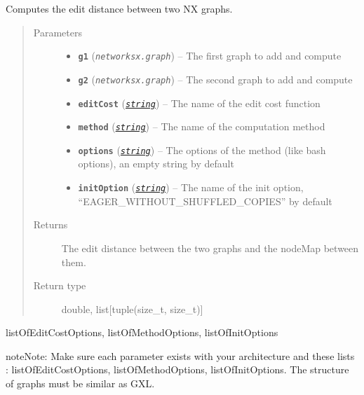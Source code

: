 \documentclass[letterpaper,10pt,english]{sphinxmanual}
\begin{document}
\begin{fulllineitems}
\label{doc:PythonGedLib.computeGedOnTwoGraphs}
Computes the edit distance between two NX graphs.
\begin{quote}\begin{description}
\item[{Parameters}] \leavevmode\begin{itemize}
\item {} 
\textbf{\texttt{g1}} (\emph{\texttt{networksx.graph}}) -- The first graph to add and compute

\item {} 
\textbf{\texttt{g2}} (\emph{\texttt{networksx.graph}}) -- The second graph to add and compute

\item {} 
\textbf{\texttt{editCost}} (\href{https://docs.python.org/3/library/string.html\#module-string}{\emph{\texttt{string}}}) -- The name of the edit cost function

\item {} 
\textbf{\texttt{method}} (\href{https://docs.python.org/3/library/string.html\#module-string}{\emph{\texttt{string}}}) -- The name of the computation method

\item {} 
\textbf{\texttt{options}} (\href{https://docs.python.org/3/library/string.html\#module-string}{\emph{\texttt{string}}}) -- The options of the method (like bash options), an empty string by default

\item {} 
\textbf{\texttt{initOption}} (\href{https://docs.python.org/3/library/string.html\#module-string}{\emph{\texttt{string}}}) -- The name of the init option, ``EAGER\_WITHOUT\_SHUFFLED\_COPIES'' by default

\end{itemize}

\item[{Returns}] \leavevmode
The edit distance between the two graphs and the nodeMap between them.

\item[{Return type}] \leavevmode
double, list{[}tuple(size\_t, size\_t){]}

\end{description}\end{quote}




listOfEditCostOptions, listOfMethodOptions, listOfInitOptions



\begin{notice}{note}{Note:}
Make sure each parameter exists with your architecture and these lists : listOfEditCostOptions, listOfMethodOptions, listOfInitOptions. The structure of graphs must be similar as GXL.
\end{notice}

\end{fulllineitems}
\end{document}
